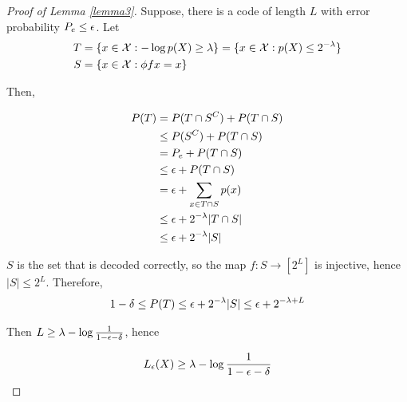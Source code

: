 \documentclass{article}
\begin{document}
\begin{proof}[Proof of Lemma \ref{lemma3}]

Suppose, there is a code of length $L$ with error probability $P_e \leq \epsilon$. Let 
\begin{align*}
    T &= \{x \in \mathcal{X}: - \log p(X) \geq \lambda\} = \{x \in \mathcal{X}: p(X) \leq 2^{-\lambda}\}\\
    S &= \{x \in \mathcal{X}: \phi f x = x\}
\end{align*}

Then, 

\begin{align*}
    P(T) 
    &= P(T \cap S^C) + P(T \cap S) \\
    &\leq P(S^C) + P(T \cap S) \\
    &= P_e + P(T \cap S) \\
    &\leq \epsilon + P(T \cap S) \\
    &= \epsilon + \sum_{x \in T \cap S} p(x) \\
    &\leq \epsilon + 2^{-\lambda} |T \cap S| \\
    &\leq \epsilon + 2^{-\lambda} |S| \\
\end{align*}

$S$ is the set that is decoded correctly, so the map $f: S \to [2^L]$ is injective, hence $|S| \leq 2^L$. Therefore, 
$$
    1 - \delta \leq P(T) \leq \epsilon + 2^{-\lambda}|S| \leq \epsilon + 2^{-\lambda + L}
$$

Then $L \geq \lambda - \log \frac{1}{1 - \epsilon - \delta}$, hence

$$
    L_\epsilon(X) \geq \lambda - \log \frac{1}{1 - \epsilon - \delta}
$$

\end{proof}
\end{document}
